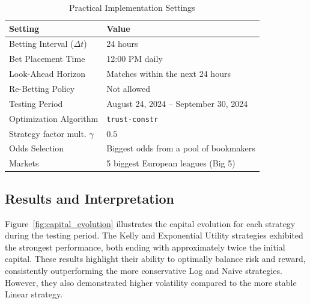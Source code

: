 \begin{table}[H]
\centering
\caption{Practical Implementation Settings}
\label{tab:implementation_settings}
\begin{tabular}{ll}
\toprule
\textbf{Setting}               & \textbf{Value}                                 \\ \midrule
Betting Interval (\( \Delta t \))     & 24 hours \\                                    
Bet Placement Time               & 12:00 PM daily                                \\
Look-Ahead Horizon               & Matches within the next 24 hours               \\ 
Re-Betting Policy                & Not allowed \\ 
Testing Period                   & August 24, 2024 – September 30, 2024           \\ 
Optimization Algorithm           & \texttt{trust-constr}                          \\ 
Strategy factor mult. \(\gamma\)         & \( 0.5 \)                              \\ 
Odds Selection                   & Biggest odds from a pool of bookmakers            \\ 
Markets & 5 biggest European leagues (Big 5) \\
\bottomrule
\end{tabular}
\end{table}


\subsection{Results and Interpretation}

Figure~\ref{fig:capital_evolution} illustrates the capital evolution for each strategy during the testing period. The Kelly and Exponential Utility strategies exhibited the strongest performance, both ending with approximately twice the initial capital. These results highlight their ability to optimally balance risk and reward, consistently outperforming the more conservative Log and Naive strategies. However, they also demonstrated higher volatility compared to the more stable Linear strategy.

